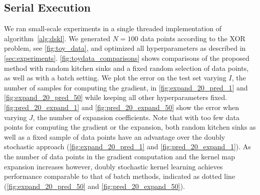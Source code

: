 \documentclass{article} %
\begin{document}
\subsection{Serial Execution}\label{sec:single_host}
We ran small-scale experiments in a single threaded implementation of algorithm~\autoref{alg:dskl}. We generated $N=100$ data points according to the XOR problem, see \autoref{fig:toy_data}, and optimized all hyperparameters as described in \autoref{sec:experiments}.
%
\autoref{fig:toydata_comparisons} shows comparisons of the proposed method with random kitchen sinks and a fixed random selection of data points, as well as with a batch setting. We plot the error on the test set varying $I$, the number of samples for computing the gradient, in \autoref{fig:expand_20_pred_1} and \autoref{fig:expand_20_pred_50} while keeping all other hyperparameters fixed. \autoref{fig:pred_20_expand_1} and \autoref{fig:pred_20_expand_50} show the error when varying $J$, the number of expansion coefficients. Note that with too few data points for computing the gradient or the expansion, both random kitchen sinks as well as a fixed sample of data points have an advantage over the doubly stochastic approach (\autoref{fig:expand_20_pred_1} and \autoref{fig:pred_20_expand_1}). As the number of data points in the gradient computation and the kernel map expansion increases however, doubly stochastic kernel learning achieves performance comparable to that of batch methods, indicated as dotted line (\autoref{fig:expand_20_pred_50} and \autoref{fig:pred_20_expand_50}).
%
\end{document}
